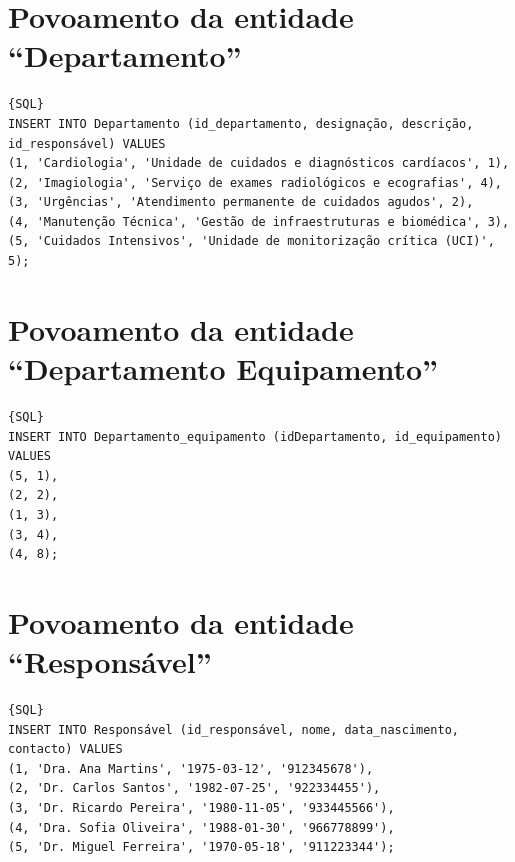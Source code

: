 \section{Povoamento da entidade “Departamento”}
{\small
\begin{lstlisting}[breaklines]{SQL}
INSERT INTO Departamento (id_departamento, designação, descrição, id_responsável) VALUES
(1, 'Cardiologia', 'Unidade de cuidados e diagnósticos cardíacos', 1),
(2, 'Imagiologia', 'Serviço de exames radiológicos e ecografias', 4),
(3, 'Urgências', 'Atendimento permanente de cuidados agudos', 2),
(4, 'Manutenção Técnica', 'Gestão de infraestruturas e biomédica', 3),
(5, 'Cuidados Intensivos', 'Unidade de monitorização crítica (UCI)', 5);
\end{lstlisting}
}

\section{Povoamento da entidade “Departamento Equipamento”}
{\small
\begin{lstlisting}[breaklines]{SQL}
INSERT INTO Departamento_equipamento (idDepartamento, id_equipamento) VALUES
(5, 1), 
(2, 2), 
(1, 3),  
(3, 4),  
(4, 8);
\end{lstlisting}
}

\section{Povoamento da entidade “Responsável”}
{\small
\begin{lstlisting}[breaklines]{SQL}
INSERT INTO Responsável (id_responsável, nome, data_nascimento, contacto) VALUES
(1, 'Dra. Ana Martins', '1975-03-12', '912345678'),
(2, 'Dr. Carlos Santos', '1982-07-25', '922334455'),
(3, 'Dr. Ricardo Pereira', '1980-11-05', '933445566'),
(4, 'Dra. Sofia Oliveira', '1988-01-30', '966778899'),
(5, 'Dr. Miguel Ferreira', '1970-05-18', '911223344');
\end{lstlisting}
}


